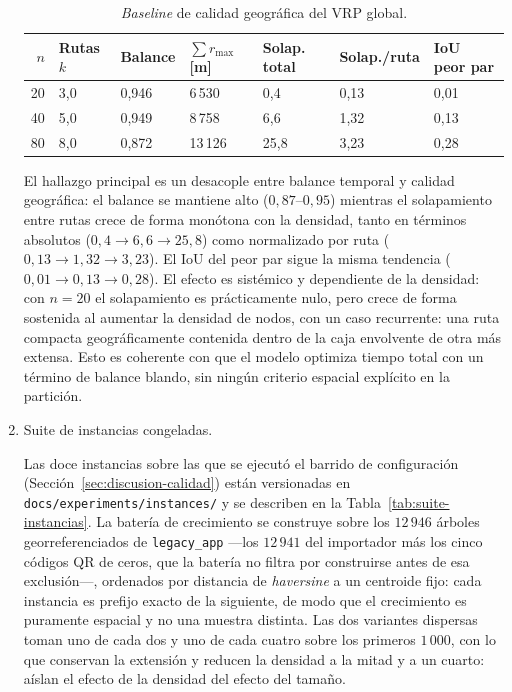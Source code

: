 \begin{enumerate}
\begin{table}[H]
  \centering
  \caption{\textit{Baseline} de calidad geográfica del VRP global.}
  \label{tab:baseline-geo}
  \begin{tabularx}{\textwidth}{rXXXXXX}
    \toprule
    $n$ &
      Rutas $k$ &
      Balance &
      $\sum r_{\max}$ [m] &
      Solap. total &
      Solap.\slash ruta &
      IoU peor par \\
    \midrule
    20 &
      3{,}0 &
      0{,}946 &
      6\,530  &
      0{,}4  &
      0{,}13 &
      0{,}01 \\
    40 &
      5{,}0 &
      0{,}949 &
      8\,758  &
      6{,}6  &
      1{,}32 &
      0{,}13 \\
    80 &
      8{,}0 &
      0{,}872 &
      13\,126 &
      25{,}8 &
      3{,}23 &
      0{,}28 \\
    \bottomrule
  \end{tabularx}
\end{table}

El hallazgo principal es un desacople entre balance temporal y calidad geográfica: el balance se
mantiene alto ($0{,}87$--$0{,}95$) mientras el solapamiento entre rutas crece de forma monótona con
la densidad, tanto en términos absolutos ($0{,}4 \to 6{,}6 \to 25{,}8$) como normalizado por ruta
($0{,}13 \to 1{,}32 \to 3{,}23$). El IoU del peor par sigue la misma tendencia ($0{,}01 \to 0{,}13
\to 0{,}28$). El efecto es sistémico y dependiente de la densidad: con $n=20$ el solapamiento es
prácticamente nulo, pero crece de forma sostenida al aumentar la densidad de nodos, con un caso
recurrente: una ruta compacta geográficamente contenida dentro de la caja envolvente de otra más
extensa. Esto es coherente con que el modelo optimiza tiempo total con un término de balance blando,
sin ningún criterio espacial explícito en la partición.

\item Suite de instancias congeladas.
\label{anx:suite-instancias}

Las doce instancias sobre las que se ejecutó el barrido de configuración
(Sección~\ref{sec:discusion-calidad}) están versionadas en \texttt{docs/experiments/instances/} y se
describen en la Tabla~\ref{tab:suite-instancias}. La batería de crecimiento se construye sobre los
$12\,946$ árboles georreferenciados de \texttt{legacy\_app} ---los $12\,941$ del importador más los
cinco códigos QR de ceros, que la batería no filtra por construirse antes de esa exclusión---,
ordenados por distancia de \textit{haversine} a un centroide fijo: cada instancia es prefijo exacto
de la siguiente, de modo que el crecimiento es puramente espacial y no una muestra distinta. Las dos
variantes dispersas toman uno de cada dos y uno de cada cuatro sobre los primeros $1\,000$, con lo
que conservan la extensión y reducen la densidad a la mitad y a un cuarto: aíslan el efecto de la
densidad del efecto del tamaño.


\end{enumerate}
